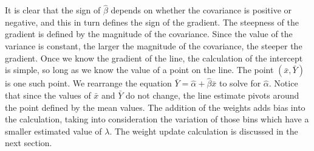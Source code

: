 \documentclass[a4paper,11pt,twoside]{article}
\begin{document}
    It is clear that the sign of $\hat{\beta}$ depends on whether the covariance
    is positive or negative, and this in turn defines the sign of the
    gradient. The steepness of the gradient is defined by the magnitude of the
    covariance. Since the value of the variance is constant, the larger the
    magnitude of the covariance, the steeper the gradient. Once we know the
    gradient of the line, the calculation of the intercept is simple, so long as
    we know the value of a point on the line. The point $(\bar{x},\bar{Y})$ is
    one such point. We rearrange the equation
    $\bar{Y}=\hat{\alpha}+\hat{\beta}\bar{x}$ to solve for
    $\hat{\alpha}$. Notice that since the values of $\bar{x}$ and $\bar{Y}$ do
    not change, the line estimate pivots around the point defined by the mean
    values. The addition of the weights adds bias into the calculation, taking
    into consideration the variation of those bins which have a smaller
    estimated value of $\lambda$. The weight update calculation is discussed in
    the next section.
\end{document}
